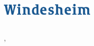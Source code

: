 \documentclass[10pt,a4paper,oneside]{report}
\title{\titel}
\author{\auteur}
\date{\datum}
\begin{document}
\begin{titlepage}

    \vspace*{-0.9cm}
    \hfill
    \includegraphics[width=0.35\textwidth]{windesheim} \\
    
    \begin{center}
    \vspace*{3cm}
    {\huge\thetitle}
    
    \vspace*{0.4cm}
    \textnormal{\ondertitel}
    \end{center}
    
    \vfill
    \raggedleft
    \theauthor \\
    \thedate, \plaats \\
    
    \vspace{\vertspace}
    \organisatie \\
    \mailorganisatie \\
    
    \vspace{\vertspace}
    \school \\
    \domein \\
\end{titlepage}
\end{document}
